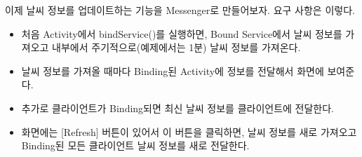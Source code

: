 이제 날씨 정보를 업데이트하는 기능을 Messenger로 만들어보자. 요구 사항은 이렇다.
\begin{itemize}
\item 처음 Activity에서 bindService()를 실행하면, Bound Service에서 날씨 정보를 가져오고 내부에서 주기적으로(예제에서는 1분) 날씨 정보를 가져온다.
\item 날씨 정보를 가져올 때마다 Binding된 Activity에 정보를 전달해서 화면에 보여준다.
\item 추가로 클라이언트가 Binding되면 최신 날씨 정보를 클라이언트에 전달한다.
\item 화면에는 [Refresh] 버튼이 있어서 이 버튼을 클릭하면, 날씨 정보를 새로 가져오고 Binding된 모든 클라이언트 날씨 정보를 새로 전달한다.
\end{itemize}

